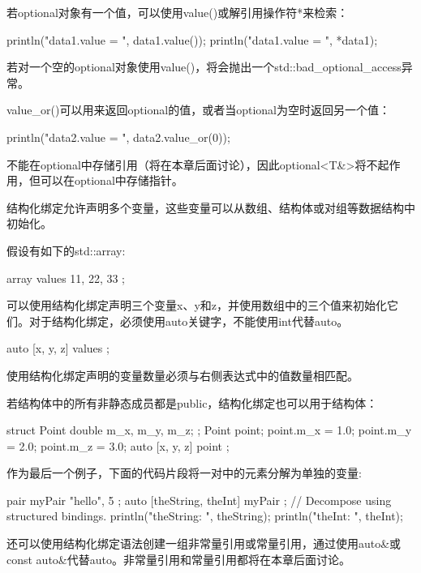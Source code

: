 若optional对象有一个值，可以使用value()或解引用操作符*来检索：

\begin{cpp}
println("data1.value = {}", data1.value());
println("data1.value = {}", *data1);
\end{cpp}

若对一个空的optional对象使用value()，将会抛出一个std::bad\_optional\_access异常。

value\_or()可以用来返回optional的值，或者当optional为空时返回另一个值：

\begin{cpp}
println("data2.value = {}", data2.value_or(0));
\end{cpp}

不能在optional中存储引用（将在本章后面讨论），因此optional<T\&>将不起作用，但可以在optional中存储指针。


结构化绑定允许声明多个变量，这些变量可以从数组、结构体或对组等数据结构中初始化。

假设有如下的std::array:

\begin{cpp}
array values { 11, 22, 33 };
\end{cpp}

可以使用结构化绑定声明三个变量x、y和z，并使用数组中的三个值来初始化它们。对于结构化绑定，必须使用auto关键字，不能使用int代替auto。

\begin{cpp}
auto [x, y, z] { values };
\end{cpp}

使用结构化绑定声明的变量数量必须与右侧表达式中的值数量相匹配。

若结构体中的所有非静态成员都是public，结构化绑定也可以用于结构体：

\begin{cpp}
struct Point { double m_x, m_y, m_z; };
Point point;
point.m_x = 1.0; point.m_y = 2.0; point.m_z = 3.0;
auto [x, y, z] { point };
\end{cpp}

作为最后一个例子，下面的代码片段将一对中的元素分解为单独的变量:

\begin{cpp}
pair myPair { "hello", 5 };
auto [theString, theInt] { myPair }; // Decompose using structured bindings.
println("theString: {}", theString);
println("theInt: {}", theInt);
\end{cpp}

还可以使用结构化绑定语法创建一组非常量引用或常量引用，通过使用auto\&或 const auto\&代替auto。非常量引用和常量引用都将在本章后面讨论。

